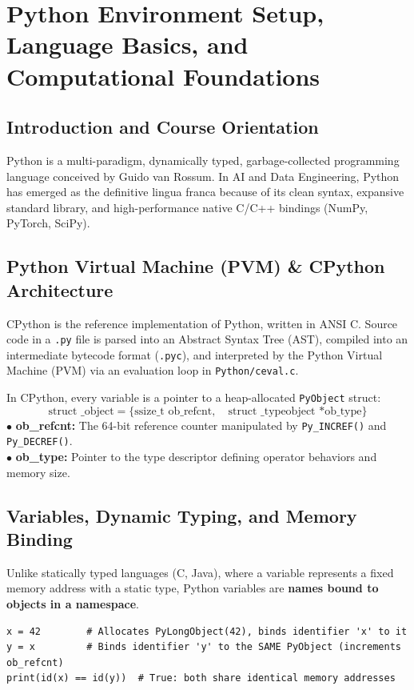 \chapter{Python Environment Setup, Language Basics, and Computational Foundations}
\label{chap:basics}

\section{Introduction and Course Orientation}
Python is a multi-paradigm, dynamically typed, garbage-collected programming language conceived by Guido van Rossum. In AI and Data Engineering, Python has emerged as the definitive lingua franca because of its clean syntax, expansive standard library, and high-performance native C/C++ bindings (NumPy, PyTorch, SciPy).

\section{Python Virtual Machine (PVM) \& CPython Architecture}
\begin{definition}
CPython is the reference implementation of Python, written in ANSI C. Source code in a \texttt{.py} file is parsed into an Abstract Syntax Tree (AST), compiled into an intermediate bytecode format (\texttt{.pyc}), and interpreted by the Python Virtual Machine (PVM) via an evaluation loop in \texttt{Python/ceval.c}.
\end{definition}

\begin{keyequation}
In CPython, every variable is a pointer to a heap-allocated \texttt{PyObject} struct:
\begin{equation}
\text{struct \_object} = \Big\{ \text{ssize\_t ob\_refcnt}, \quad \text{struct \_typeobject *ob\_type} \Big\}
\end{equation}
$\bullet$ \textbf{ob\_refcnt:} The 64-bit reference counter manipulated by \texttt{Py\_INCREF()} and \texttt{Py\_DECREF()}.\\
$\bullet$ \textbf{ob\_type:} Pointer to the type descriptor defining operator behaviors and memory size.
\end{keyequation}

\section{Variables, Dynamic Typing, and Memory Binding}
Unlike statically typed languages (C, Java), where a variable represents a fixed memory address with a static type, Python variables are \textbf{names bound to objects in a namespace}.
\begin{lstlisting}
x = 42        # Allocates PyLongObject(42), binds identifier 'x' to it
y = x         # Binds identifier 'y' to the SAME PyObject (increments ob_refcnt)
print(id(x) == id(y))  # True: both share identical memory addresses
\end{lstlisting}

